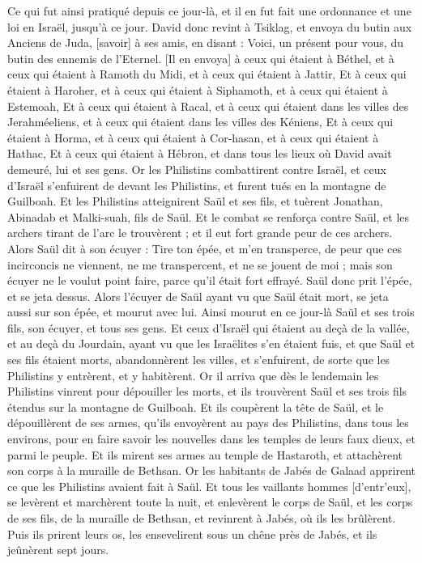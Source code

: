 \begin{multicols}{2}
Ce qui fut ainsi pratiqué depuis ce jour-là, et il en fut fait une ordonnance et une loi en Israël, jusqu'à ce jour.
David donc revint à Tsiklag, et envoya du butin aux Anciens de Juda, [savoir] à ses amis, en disant : Voici, un présent pour vous, du butin des ennemis de l'Eternel.
[Il en envoya] à ceux qui étaient à Béthel, et à ceux qui étaient à Ramoth du Midi, et à ceux qui étaient à Jattir,
Et à ceux qui étaient à Haroher, et à ceux qui étaient à Siphamoth, et à ceux qui étaient à Estemoah,
Et à ceux qui étaient à Racal, et à ceux qui étaient dans les villes des Jerahméeliens, et à ceux qui étaient dans les villes des Kéniens,
Et à ceux qui étaient à Horma, et à ceux qui étaient à Cor-hasan, et à ceux qui étaient à Hathac,
Et à ceux qui étaient à Hébron, et dans tous les lieux où David avait demeuré, lui et ses gens.
\VerseOne{}Or les Philistins combattirent contre Israël, et ceux d'Israël s'enfuirent de devant les Philistins, et furent tués en la montagne de Guilboah.
Et les Philistins atteignirent Saül et ses fils, et tuèrent Jonathan, Abinadab et Malki-suah, fils de Saül.
Et le combat se renforça contre Saül, et les archers tirant de l'arc le trouvèrent ; et il eut fort grande peur de ces archers.
Alors Saül dit à son écuyer : Tire ton épée, et m'en transperce, de peur que ces incirconcis ne viennent, ne me transpercent, et ne se jouent de moi ; mais son écuyer ne le voulut point faire, parce qu'il était fort effrayé. Saül donc prit l'épée, et se jeta dessus.
Alors l'écuyer de Saül ayant vu que Saül était mort, se jeta aussi sur son épée, et mourut avec lui.
Ainsi mourut en ce jour-là Saül et ses trois fils, son écuyer, et tous ses gens.
Et ceux d'Israël qui étaient au deçà de la vallée, et au deçà du Jourdain, ayant vu que les Israëlites s'en étaient fuis, et que Saül et ses fils étaient morts, abandonnèrent les villes, et s'enfuirent, de sorte que les Philistins y entrèrent, et y habitèrent.
Or il arriva que dès le lendemain les Philistins vinrent pour dépouiller les morts, et ils trouvèrent Saül et ses trois fils étendus sur la montagne de Guilboah.
Et ils coupèrent la tête de Saül, et le dépouillèrent de ses armes, qu'ils envoyèrent au pays des Philistins, dans tous les environs, pour en faire savoir les nouvelles dans les temples de leurs faux dieux, et parmi le peuple.
Et ils mirent ses armes au temple de Hastaroth, et attachèrent son corps à la muraille de Bethsan.
Or les habitants de Jabés de Galaad apprirent ce que les Philistins avaient fait à Saül.
Et tous les vaillants hommes [d'entr'eux], se levèrent et marchèrent toute la nuit, et enlevèrent le corps de Saül, et les corps de ses fils, de la muraille de Bethsan, et revinrent à Jabés, où ils les brûlèrent.
Puis ils prirent leurs os, les ensevelirent sous un chêne près de Jabés, et ils jeûnèrent sept jours.
\PPE{}
\end{multicols}

